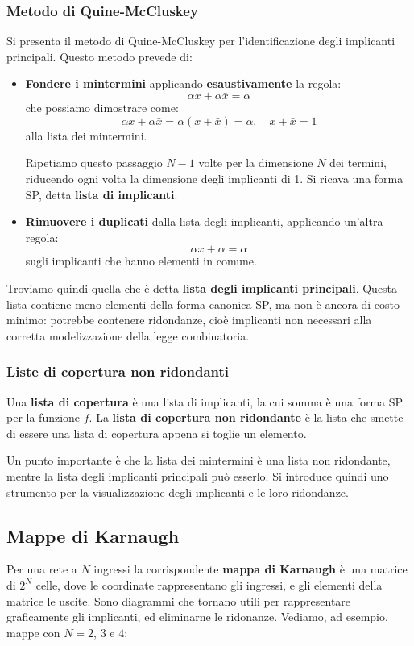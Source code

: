 \documentclass[a4paper,11pt]{article}
\begin{document}
\subsubsection{Metodo di Quine-McCluskey}
Si presenta il metodo di Quine-McCluskey per l'identificazione degli implicanti principali.
Questo metodo prevede di:
\begin{itemize}
	\item \textbf{Fondere i mintermini} applicando \textbf{esaustivamente} la regola:
$$
\alpha x + \alpha \bar{x} = \alpha
$$
che possiamo dimostrare come:
$$
\alpha x + \alpha \bar{x} = \alpha (x + \bar{x}) = \alpha, \quad x + \bar{x} = 1
$$
alla lista dei mintermini.

Ripetiamo questo passaggio $N - 1$ volte per la dimensione $N$ dei termini, riducendo ogni volta la dimensione degli implicanti di 1.
Si ricava una forma SP, detta \textbf{lista di implicanti}.
	\item \textbf{Rimuovere i duplicati} dalla lista degli implicanti, applicando un'altra regola:
$$
\alpha x + \alpha = \alpha 
$$
sugli implicanti che hanno elementi in comune.
\end{itemize}

Troviamo quindi quella che è detta \textbf{lista degli implicanti principali}.
Questa lista contiene meno elementi della forma canonica SP, ma non è ancora di costo minimo: potrebbe contenere ridondanze, cioè implicanti non necessari alla corretta modelizzazione della legge combinatoria.

\subsubsection{Liste di copertura non ridondanti}
Una \textbf{lista di copertura} è una lista di implicanti, la cui somma è una forma SP per la funzione $f$.
La \textbf{lista di copertura non ridondante} è la lista che smette di essere una lista di copertura appena si toglie un elemento.

Un punto importante è che la lista dei mintermini è una lista non ridondante, mentre la lista degli implicanti principali può esserlo.
Si introduce quindi uno strumento per la visualizzazione degli implicanti e le loro ridondanze.

\subsection{Mappe di Karnaugh}
Per una rete a $N$ ingressi la corrispondente \textbf{mappa di Karnaugh} è una matrice di $2^N$ celle, dove le coordinate rappresentano gli ingressi, e gli elementi della matrice le uscite.
Sono diagrammi che tornano utili per rappresentare graficamente gli implicanti, ed eliminarne le ridonanze.
Vediamo, ad esempio, mappe con $N = 2$, $3$ e $4$:
\end{document}
